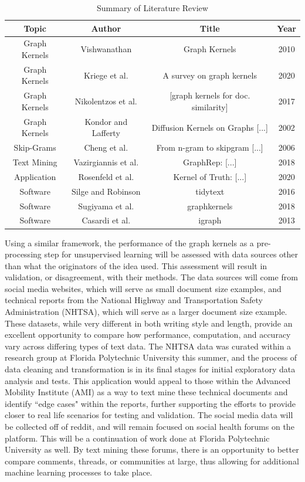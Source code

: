 \documentclass[11pt]{report}
\begin{document}
\begin{table}[H]
\caption{Summary of Literature Review}
\centering
\begin{tabular}{ c c c c}
\hline
\hline
Topic & Author & Title & Year \\ [0.5ex]
\hline
Graph Kernels & Vishwanathan & Graph Kernels & 2010\\
Graph Kernels & Kriege et al. & A survey on graph kernels & 2020\\
Graph Kernels & Nikolentzos et al. & [graph kernels for doc. similarity] & 2017\\
Graph Kernels & Kondor and Lafferty &  Diffusion Kernels on Graphs [...] & 2002\\
Skip-Grams & Cheng et al. & From n-gram to skipgram [...] & 2006\\
Text Mining & Vazirgiannis et al. & GraphRep: [...] & 2018 \\
Application & Rosenfeld et al. & Kernel of Truth: [...] & 2020\\
Software & Silge and Robinson& tidytext &  2016\\
Software & Sugiyama et al. & graphkernels & 2018 \\
Software & Casardi et al. & igraph & 2013\\


\hline
\end{tabular}

\end{table}

Using a similar framework, the performance of the graph kernels as a pre-processing step for unsupervised learning will be assessed with data sources other than what the originators of the idea used. This assessment will result in validation, or disagreement, with their methods. The data sources will come from social media websites, which will serve as small document size examples, and technical reports from the National Highway and Transportation Safety Administration (NHTSA), which will serve as a larger document size example. These datasets, while very different in both writing style and length, provide an excellent opportunity to compare how performance, computation, and accuracy vary across differing types of text data. The NHTSA data was curated within a research group at Florida Polytechnic University this summer, and the process of data cleaning and transformation is in its final stages for initial exploratory data analysis and tests. This application would appeal to those within the Advanced Mobility Institute (AMI) as a way to text mine these technical documents and identify ``edge cases" within the reports, further supporting the efforts to provide closer to real life scenarios for testing and validation. The social media data will be collected off of reddit, and will remain focused on social health forums on the platform. This will be a continuation of work done at Florida Polytechnic University as well. By text mining these forums, there is an opportunity to better compare comments, threads, or communities at large, thus allowing for additional machine learning processes to take place. 
\end{document}
